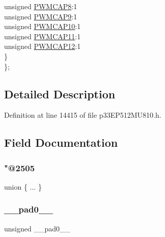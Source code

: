 \begin{DoxyCompactItemize}
\begin{tabbing}
\>\>unsigned \hyperlink{structtag_p_w_m_c_a_p2_b_i_t_s_a01b802d233dbea59cd23996d219e39c9}{PWMCAP8}:1\\
\>\>unsigned \hyperlink{structtag_p_w_m_c_a_p2_b_i_t_s_a9a0cd5d7a58681927adecfd9946b75fb}{PWMCAP9}:1\\
\>\>unsigned \hyperlink{structtag_p_w_m_c_a_p2_b_i_t_s_a765ff5b5b1008d8aeb0359590759bd42}{PWMCAP10}:1\\
\>\>unsigned \hyperlink{structtag_p_w_m_c_a_p2_b_i_t_s_a50c60306a98023b9bb8fac50c8d5e965}{PWMCAP11}:1\\
\>\>unsigned \hyperlink{structtag_p_w_m_c_a_p2_b_i_t_s_a8fec92523cf22c89f156a97aca44dcff}{PWMCAP12}:1\\
\>\} \\
\}; \\

\end{tabbing}\end{DoxyCompactItemize}


\subsection{Detailed Description}


Definition at line 14415 of file p33\+E\+P512\+M\+U810.\+h.



\subsection{Field Documentation}
\mbox{\label{structtag_p_w_m_c_a_p2_b_i_t_s_ad50b5ff176841221f1f5e7a8fe4ca84f}} 
\subsubsection{\texorpdfstring{"@2505}{@2505}}
{\footnotesize\ttfamily union \{ ... \} }

\mbox{\label{structtag_p_w_m_c_a_p2_b_i_t_s_adf71f3d8410c1f1dbbc96680a92c49af}} 
\subsubsection{\texorpdfstring{\+\_\+\+\_\+pad0\+\_\+\+\_\+}{\_\_pad0\_\_}}
{\footnotesize\ttfamily unsigned \+\_\+\+\_\+pad0\+\_\+\+\_\+}



